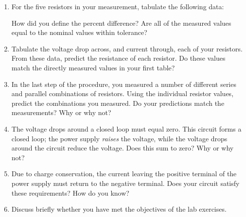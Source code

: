 \documentclass[12pt]{article}
\begin{document}
\begin{enumerate}
\item For the five resistors in your measurement, tabulate the
  following data:
  How did you define the percent difference? Are all of the measured
  values equal to the nominal values within tolerance?
\item Tabulate the voltage drop across, and current through, each of
  your resistors.  From these data, predict the resistance of each
  resistor.  Do these values match the directly measured values in
  your first table?
\item In the last step of the procedure, you measured a number of
  different series and parallel combinations of resistors.  Using the
  individual resistor values, predict the combinations you measured.
  Do your predictions match the measurements?  Why or why not?
\item The voltage drops around a closed loop must equal zero.  This
  circuit forms a closed loop; the power supply \textit{raises} the
  voltage, while the voltage drops around the circuit reduce the
  voltage.  Does this sum to zero?  Why or why not?
\item Due to charge conservation, the current leaving the positive
  terminal of the power supply must return to the negative terminal.
  Does your circuit satisfy these requirements?  How do you know?
\item Discuss briefly whether you have met the objectives of the lab
  exercises.
\end{enumerate}
\end{document}
